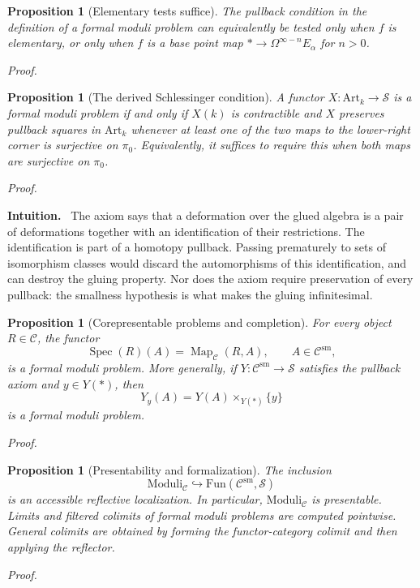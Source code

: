 \documentclass[12pt,letterpaper,oneside]{report}
\newtheorem{proposition}[theorem]{Proposition}
\theoremstyle{definition}
\theoremstyle{remark}
\renewenvironment{proof}[1][Proof]{\par\nopagebreak[4]\addvspace{4pt}\noindent\textit{#1.}\par\nobreak\vspace{0.5\baselineskip}}{\par\addvspace{4pt}}
\newenvironment{intuition}{\par\noindent\textbf{Intuition.}\ }{\par}
\newcommand{\cS}{\mathcal S}
\newcommand{\cC}{\mathcal C}
\newcommand{\FMP}{\mathrm{Moduli}}
\newcommand{\Art}{\mathrm{Art}_k}
\newcommand{\Fun}{\mathrm{Fun}}
\newcommand{\Map}{\operatorname{Map}}
\newcommand{\Spec}{\operatorname{Spec}}
\newcommand{\sm}{\mathrm{sm}}
\newcommand{\term}{*}
\begin{document}
\begin{proposition}[Elementary tests suffice]
\label{prop:elementary-test}
The pullback condition in the definition of a formal moduli problem can equivalently be tested only when $f$ is elementary, or only when $f$ is a base point map $\term\to\Omega^{\infty-n}E_\alpha$ for $n>0$.
\end{proposition}
\begin{proof}
\end{proof}


\begin{proposition}[The derived Schlessinger condition]
\label{prop:schlessinger}
A functor $X:\Art\to\cS$ is a formal moduli problem if and only if $X(k)$ is contractible and $X$ preserves pullback squares in $\Art$ whenever at least one of the two maps to the lower-right corner is surjective on $\pi_0$. Equivalently, it suffices to require this when both maps are surjective on $\pi_0$.
\end{proposition}
\begin{proof}
\end{proof}


\begin{intuition}
The axiom says that a deformation over the glued algebra is a pair of deformations together with an identification of their restrictions. The identification is part of a homotopy pullback. Passing prematurely to sets of isomorphism classes would discard the automorphisms of this identification, and can destroy the gluing property. Nor does the axiom require preservation of every pullback: the smallness hypothesis is what makes the gluing infinitesimal.
\end{intuition}

\begin{proposition}[Corepresentable problems and completion]
\label{prop:corepresentable}
For every object $R\in\cC$, the functor
\[
 \Spec(R)(A)=\Map_{\cC}(R,A),\qquad A\in\cC^{\sm},
\]
is a formal moduli problem. More generally, if $Y:\cC^{\sm}\to\cS$ satisfies the pullback axiom and $y\in Y(\term)$, then
\[
 Y_y(A)=Y(A)\mathbin{\times}_{Y(\term)}\{y\}
\]
is a formal moduli problem.
\end{proposition}
\begin{proof}
\end{proof}


\begin{proposition}[Presentability and formalization]
\label{prop:presentable-moduli}
The inclusion
\[
 \FMP_{\cC}\hookrightarrow\Fun(\cC^{\sm},\cS)
\]
is an accessible reflective localization. In particular, $\FMP_{\cC}$ is presentable. Limits and filtered colimits of formal moduli problems are computed pointwise. General colimits are obtained by forming the functor-category colimit and then applying the reflector.
\end{proposition}
\begin{proof}
\end{proof}
\end{document}
